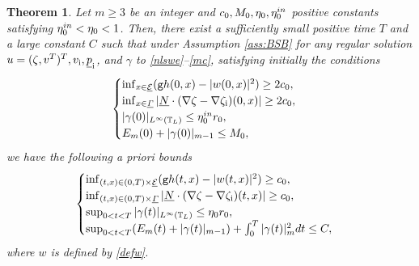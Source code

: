 \documentclass[11pt]{article}
\newcommand{\gr}{{\mathtt g}}
\newcommand{\cE}{{\mathcal E}}
\newcommand{\ul}[1]{\underline{#1}}
\newcommand{\itGamma}{\mathit{\Gamma}}
\newtheorem{theorem}{Theorem}[section]
\theoremstyle{definition}
\begin{document}
\begin{theorem}\label{th:main}
Let $m\geq3$ be an integer and $c_0, M_0, \eta_0, \eta_0^{\rm in}$ positive constants satisfying $\eta_0^{\rm in}<\eta_0<1$.
Then, there exist a sufficiently small positive time $T$ and a large constant $C$ such that under Assumption \ref{ass:BSB} for any regular solution
$u=(\zeta,v^{\rm T})^{\rm T},v_\mathrm{i},\ul{p}_\mathrm{i}$, and $\gamma$ to \eqref{nlswe}--\eqref{mc}, satisfying initially the conditions
\begin{equation}\label{EstIni}
\begin{cases}
\inf_{x\in\ul{\cE}}(\gr h(0,x)-|w(0,x)|^2) \geq 2c_0, \\
\inf_{x\in\ul{\itGamma}}| \ul{N}\cdot(\nabla\zeta-\nabla\zeta_\mathrm{i})(0,x)| \geq 2c_0, \\
|\gamma(0)|_{L^\infty(\mathbb{T}_L)} \leq \eta_0^{\rm in}r_0, \\
E_m(0) + |\gamma(0)|_{m-1} \leq M_0,
\end{cases}
\end{equation}
we have the following a priori bounds
\begin{equation}\label{APE}
\begin{cases}
\inf_{(t,x)\in(0,T)\times\ul{\cE}}(\gr h(t,x)-|w(t,x)|^2) \geq c_0, \\
\inf_{(t,x)\in(0,T)\times\ul{\itGamma}}| \ul{N}\cdot(\nabla\zeta-\nabla\zeta_\mathrm{i})(t,x)| \geq c_0, \\
\sup_{0<t<T}|\gamma(t)|_{L^\infty(\mathbb{T}_L)} \leq \eta_0r_0, \\
\sup_{0<t<T}(E_m(t) + |\gamma(t)|_{m-1}) + \int_0^T|\gamma(t)|_m^2{\rm d}t \leq C,
\end{cases}
\end{equation}
where $w$ is defined by \eqref{defw}.
\end{theorem}
\end{document}
